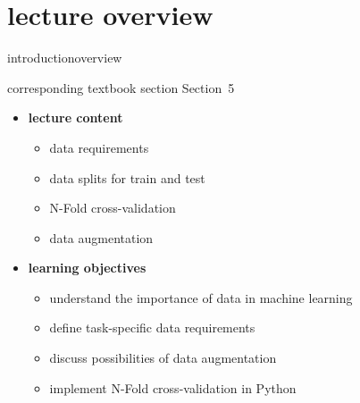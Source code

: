 


\subtitle{Module 5.0: Data, Data Splits, and Augmentation}


	

    \section[overview]{lecture overview}
        \begin{frame}{introduction}{overview}
            \begin{block}{corresponding textbook section}
                    Section~5
            \end{block}

            \begin{itemize}
                \item   \textbf{lecture content}
                    \begin{itemize}
                        \item   data requirements
                        \item   data splits for train and test
                        \item   N-Fold cross-validation
                        \item   data augmentation
                    \end{itemize}
                \bigskip
                \item<2->   \textbf{learning objectives}
                    \begin{itemize}
                        \item   understand the importance of data in machine learning 
                        \item   define task-specific data requirements
                        \item   discuss possibilities of data augmentation
                        \item   implement N-Fold cross-validation in Python
                    \end{itemize}
            \end{itemize}
        \end{frame}

